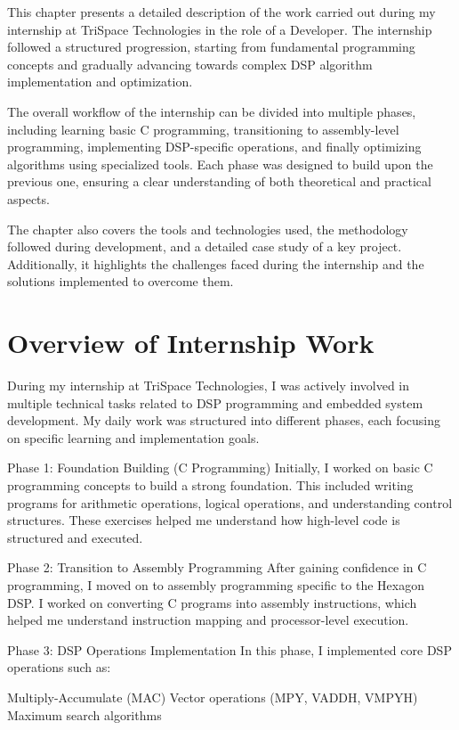 \documentclass[12pt,a4paper]{report}
\begin{document}
This chapter presents a detailed description of the work carried out during my internship at TriSpace Technologies in the role of a Developer. The internship followed a structured progression, starting from fundamental programming concepts and gradually advancing towards complex DSP algorithm implementation and optimization.


The overall workflow of the internship can be divided into multiple phases, including learning basic C programming, transitioning to assembly-level programming, implementing DSP-specific operations, and finally optimizing algorithms using specialized tools. Each phase was designed to build upon the previous one, ensuring a clear understanding of both theoretical and practical aspects.


The chapter also covers the tools and technologies used, the methodology followed during development, and a detailed case study of a key project. Additionally, it highlights the challenges faced during the internship and the solutions implemented to overcome them.


\section{Overview of Internship Work}

During my internship at TriSpace Technologies, I was actively involved in multiple technical tasks related to DSP programming and embedded system development. My daily work was structured into different phases, each focusing on specific learning and implementation goals.


Phase 1: Foundation Building (C Programming) Initially, I worked on basic C programming concepts to build a strong foundation. This included writing programs for arithmetic operations, logical operations, and understanding control structures. These exercises helped me understand how high-level code is structured and executed.


Phase 2: Transition to Assembly Programming After gaining confidence in C programming, I moved on to assembly programming specific to the Hexagon DSP. I worked on converting C programs into assembly instructions, which helped me understand instruction mapping and processor-level execution.


Phase 3: DSP Operations Implementation In this phase, I implemented core DSP operations such as:


Multiply-Accumulate (MAC) Vector operations (MPY, VADDH, VMPYH) Maximum search algorithms
\end{document}
